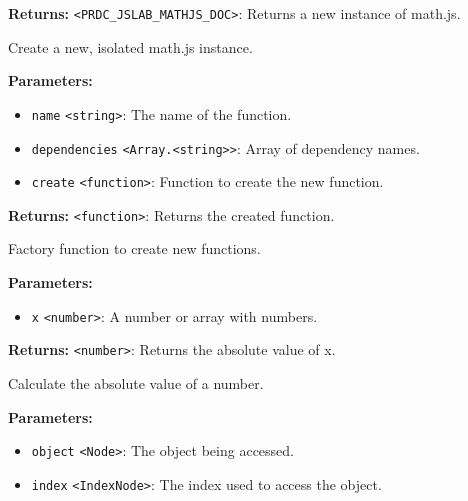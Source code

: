 \documentclass[12pt,a4paper]{article}
\begin{document}
\noindent \textbf{Returns:} \texttt{<PRDC\_JSLAB\_MATHJS\_DOC>}: Returns a new instance of math.js.

\noindent Create a new, isolated math.js instance.

\vspace{5mm}
\noindent {}


\noindent \textbf{Parameters:}
\begin{itemize}
  \item \texttt{name} \texttt{<string>}: The name of the function.
  \item \texttt{dependencies} \texttt{<Array.<string>>}: Array of dependency names.
  \item \texttt{create} \texttt{<function>}: Function to create the new function.
\end{itemize}

\noindent \textbf{Returns:} \texttt{<function>}: Returns the created function.

\noindent Factory function to create new functions.

\vspace{5mm}
\noindent {}


\noindent \textbf{Parameters:}
\begin{itemize}
  \item \texttt{x} \texttt{<number>}: A number or array with numbers.
\end{itemize}

\noindent \textbf{Returns:} \texttt{<number>}: Returns the absolute value of \textasciigrave{}x\textasciigrave{}.

\noindent Calculate the absolute value of a number.

\vspace{5mm}
\noindent {}


\noindent \textbf{Parameters:}
\begin{itemize}
  \item \texttt{object} \texttt{<Node>}: The object being accessed.
  \item \texttt{index} \texttt{<IndexNode>}: The index used to access the object.
\end{itemize}
\end{document}
